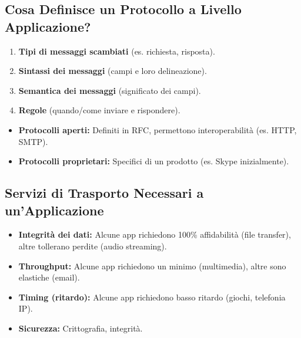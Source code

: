 \documentclass{article}
\begin{document}
\subsection{Cosa Definisce un Protocollo a Livello Applicazione?}
\begin{enumerate}
    \item \textbf{Tipi di messaggi scambiati} (es. richiesta, risposta).
    \item \textbf{Sintassi dei messaggi} (campi e loro delineazione).
    \item \textbf{Semantica dei messaggi} (significato dei campi).
    \item \textbf{Regole} (quando/come inviare e rispondere).
\end{enumerate}
\begin{itemize}
    \item \textbf{Protocolli aperti:} Definiti in RFC, permettono interoperabilità (es. HTTP, SMTP).
    \item \textbf{Protocolli proprietari:} Specifici di un prodotto (es. Skype inizialmente).
\end{itemize}

\subsection{Servizi di Trasporto Necessari a un'Applicazione}
\begin{itemize}
    \item \textbf{Integrità dei dati:} Alcune app richiedono 100\% affidabilità (file transfer), altre tollerano perdite (audio streaming).
    \item \textbf{Throughput:} Alcune app richiedono un minimo (multimedia), altre sono elastiche (email).
    \item \textbf{Timing (ritardo):} Alcune app richiedono basso ritardo (giochi, telefonia IP).
    \item \textbf{Sicurezza:} Crittografia, integrità.
\end{itemize}
\end{document}
